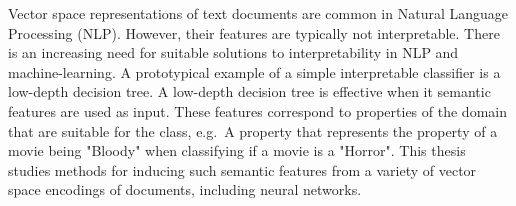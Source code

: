 Vector space representations of text documents are common in Natural Language Processing (NLP). However, their features are typically not interpretable.  There is an increasing need for suitable solutions to interpretability in NLP and machine-learning. A prototypical example of a simple interpretable classifier is a low-depth decision tree. A low-depth decision tree is effective when it  semantic features are used as input. These features  correspond to properties of the domain that are suitable for the class, e.g.\ A property that represents the property of a movie being "Bloody" when classifying if a movie is a "Horror". This thesis studies methods for inducing such semantic features from a variety of vector space encodings of documents, including neural networks.












